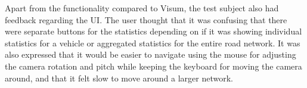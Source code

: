         Apart from the functionality compared to Visum, the test subject also had feedback regarding the UI. The user thought that it was confusing that there were separate buttons for the statistics depending on if it was showing individual statistics for a vehicle or aggregated statistics for the entire road network. It was also expressed that it would be easier to navigate using the mouse for adjusting the camera rotation and pitch while keeping the keyboard for moving the camera around, and that it felt slow to move around a larger network.